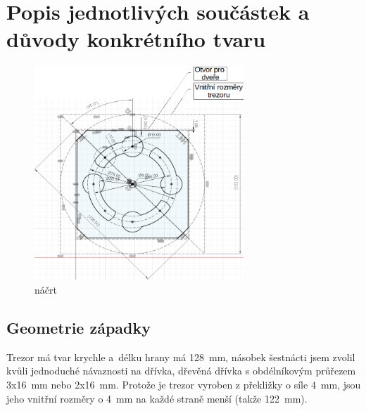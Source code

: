 \section{Popis jednotlivých součástek a důvody konkrétního tvaru}

\begin{figure}
    \includegraphics[width=0.7\textwidth]{kapitoly/obrazky/M3/geometrie_zapadky.png}
    \caption{náčrt} %
    \label{fig:M3-geometrie-zapadky}
\end{figure} %

\subsection*{Geometrie západky}
Trezor má tvar krychle a~délku hrany má 128~mm, násobek šestnácti jsem zvolil kvůli jednoduché návaznosti na dřívka, %
 dřevěná dřívka s obdélníkovým průřezem 3x16~mm nebo 2x16~mm. 
Protože je trezor vyroben z překližky o síle 4~mm, jsou jeho vnitřní rozměry o 4~mm na každé straně menší (takže 122~mm). 

